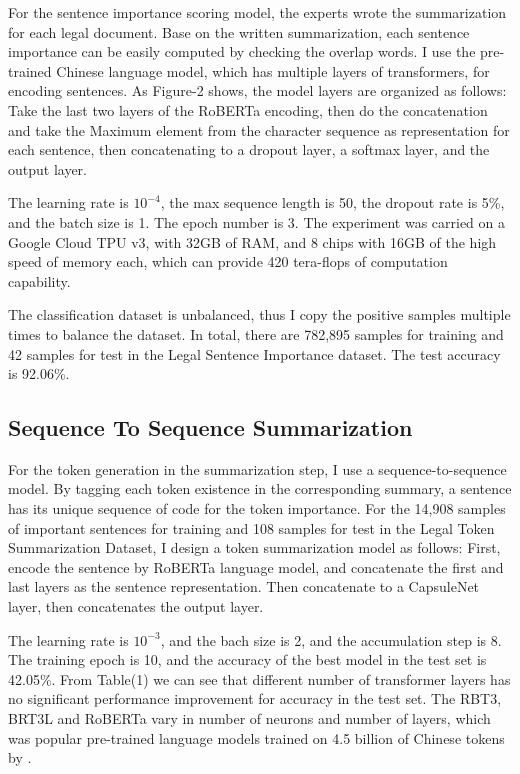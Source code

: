 \documentclass[11pt,a4paper]{article}
\begin{document}
For the sentence importance scoring model, the experts wrote the summarization for each legal document.
Base on the written summarization, each sentence importance can be easily computed by checking the overlap words.
I use the pre-trained Chinese language model, which has multiple layers of transformers,
for encoding sentences.
As Figure-2 shows, the model layers are organized as follows:
Take the last two layers of the RoBERTa encoding, then do the concatenation and take the Maximum element from the character
sequence as representation for each sentence, then concatenating to a dropout layer, a softmax layer,
and the output layer.

The learning rate is $10^{-4}$, the max sequence length is 50, the dropout rate is 5\%, and the batch size is 1.
The epoch number is 3.
The experiment was carried on a Google Cloud TPU v3, with 32GB of RAM, and 8 chips with 16GB of the high speed of memory each,
which can provide 420 tera-flops of computation capability.

The classification dataset is unbalanced, thus I copy the positive samples multiple times to balance the dataset.
In total, there are 782,895 samples for training and 42 samples for test in the Legal Sentence Importance dataset.
The test accuracy is 92.06\%.

\subsection{Sequence To Sequence Summarization}

For the token generation in the summarization step, I use a sequence-to-sequence model.
By tagging each token existence in the corresponding summary, a sentence has its unique sequence of code for the token importance.
For the 14,908 samples of important sentences for training and 108 samples for test in the Legal Token Summarization Dataset,
I design a token summarization model as follows:
First, encode the sentence by RoBERTa language model, and concatenate the first and last layers as the sentence representation.
Then concatenate to a CapsuleNet layer, then concatenates the output layer.

The learning rate is $10^{-3}$, and the bach size is 2, and the accumulation step is 8.
The training epoch is 10, and the accuracy of the best model in the test set is 42.05\%.
From Table(1) we can see that different number of transformer layers has no significant performance improvement for accuracy in the test set.
The RBT3, BRT3L and RoBERTa vary in number of neurons and number of layers,
which was popular pre-trained language models trained on 4.5 billion of Chinese tokens by \citet{cui2020revisiting}.
\end{document}
